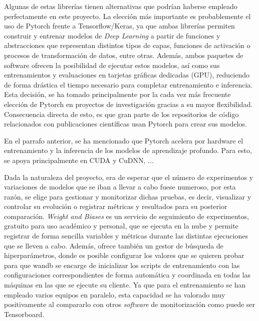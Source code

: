 Algunas de estas librerías tienen alternativas que podrían haberse empleado perfectamente en este proyecto. La elección más importante es probablemente el uso de Pytorch frente a Tensorflow/Keras, ya que ambas librerías permiten construir y entrenar modelos de \textit{Deep Learning} a partir de funciones y abstracciones que representan distintos tipos de capas, funciones de activación o procesos de transformación de datos, entre otras. Además, ambos paquetes de software ofrecen la posibilidad de ejecutar estos modelos, así como sus entrenamientos y evaluaciones en tarjetas gráficas dedicadas (GPU), reduciendo de forma drástica el tiempo necesario para completar entrenamiento e inferencia. Esta decisión, se ha tomado principalmente por la cada vez más frecuente elección de Pytorch en proyectos de investigación gracias a su mayor flexibilidad. Consecuencia directa de esto, es que gran parte de los repositorios de código relacionados con publicaciones científicas usan Pytorch para crear sus modelos.

En el parrafo anterior, se ha mencionado que Pytorch acelera por hardware el entrenamiento y la inferencia de los modelos de aprendizaje profundo. Para esto, se apoya principalmente en CUDA y CuDNN, ...

Dada la naturaleza del proyecto, era de esperar que el número de experimentos y variaciones de modelos que se iban a llevar a cabo fuese numeroso, por esta razón, se elige  para gestionar y monitorizar dichas pruebas, es decir, visualizar y controlar su evolución o registrar métricas y resultados para su posterior comparación. \textit{Weight and Biases} es un servicio de seguimiento de experimentos, gratuito para uso académico y personal, que se ejecuta en la nube y permite registrar de forma sencilla variables y métricas durante las distintas ejecuciones que se lleven a cabo. Además, ofrece también un gestor de búsqueda de hiperparámetros, donde es posible configurar los valores que se quieren probar para que wandb se encarge de inicializar los scripts de entrenamiento con las configuraciones correspondientes de forma automática y coordinada en todas las máquinas en las que se ejecute su cliente. Ya que para el entrenamiento se han empleado varios equipos en paralelo, esta capacidad se ha valorado muy positivamente al compararlo con otros \textit{software} de monitorización como puede ser Tensorboard.

